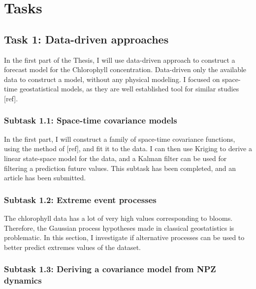 

\chapter{Tasks}

	\section{Task 1: Data-driven approaches}
	\label{datadriv}

		In the first part of the Thesis, I will use data-driven approach to construct a forecast model for the Chlorophyll concentration. Data-driven only the available data to construct a model, without any physical modeling. I focused on space-time geostatistical models, as they are well established tool for similar studies [ref]. 

		\subsection{Subtask 1.1: Space-time covariance models}
		\label{datadriv:covmod}

	   		In the first part, I will construct a family of space-time covariance functions, using the method of [ref], and fit it to the data. I can then use Kriging to derive a linear state-space model for the data, and a Kalman filter can be used for filtering a prediction future values. This subtask has been completed, and an article has been submitted.

		\subsection{Subtask 1.2: Extreme event processes}
		\label{datadriv:extreme}

			The chlorophyll data has a lot of very high values corresponding to blooms. Therefore, the Gaussian process hypotheses made in classical geostatistics is problematic. In this section, I investigate if alternative processes can be used to better predict extremes values of the dataset. 

		\subsection{Subtask 1.3: Deriving a covariance model from NPZ dynamics}
		\label{datadriv:npzcov}


